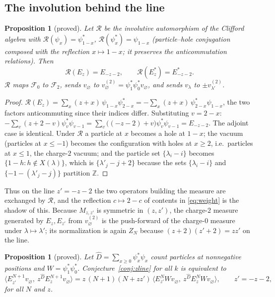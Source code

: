 \documentclass[11pt]{article}
\newtheorem{proposition}[theorem]{Proposition}
\theoremstyle{definition}
\theoremstyle{remark}
\newcommand{\Z}{\mathbb{Z}}
\newcommand{\ket}[1]{v_{#1}}
\begin{document}
\subsection{The involution behind the line}

\begin{proposition}[proved]\label{prop:involution}
Let $\mathcal R$ be the involutive automorphism of the Clifford algebra with $\mathcal R(\psi_x)=\psi^*_{1-x}$, $\mathcal R(\psi^*_x)=\psi_{1-x}$ (particle--hole conjugation composed with the reflection $x\mapsto1-x$; it preserves the anticommutation relations). Then
\[
\mathcal R(E_z)=E_{-z-2},\qquad\mathcal R(E_z^*)=E_{-z-2}^* .
\]
$\mathcal R$ maps $\mathcal F_0$ to $\mathcal F_2$, sends $\ket\varnothing$ to $\ket\varnothing^{(2)}=\psi^*_1\psi^*_0\ket\varnothing$, and sends $\ket\lambda$ to $\pm\ket{\lambda'}^{(2)}$.
\end{proposition}

\begin{proof}
$\mathcal R(E_z)=\sum_x(z+x)\,\psi_{1-x}\psi^*_{2-x}=-\sum_x(z+x)\,\psi^*_{2-x}\psi_{1-x}$, the two factors anticommuting since their indices differ. Substituting $v=2-x$: $-\sum_v(z+2-v)\psi^*_v\psi_{v-1}=\sum_v\bigl((-z-2)+v\bigr)\psi^*_v\psi_{v-1}=E_{-z-2}$. The adjoint case is identical. Under $\mathcal R$ a particle at $x$ becomes a hole at $1-x$; the vacuum (particles at $x\le-1$) becomes the configuration with holes at $x\ge2$, i.e.\ particles at $x\le1$, the charge-$2$ vacuum; and the particle set $\{\lambda_i-i\}$ becomes $\{1-h:h\notin X(\lambda)\}$, which is $\{\lambda'_j-j+2\}$ because the sets $\{\lambda_i-i\}$ and $\{-1-(\lambda'_j-j)\}$ partition $\Z$.
\end{proof}

Thus on the line $z'=-z-2$ the two operators building the measure are exchanged by $\mathcal R$, and the reflection $c\mapsto2-c$ of contents in \eqref{eq:weight} is the shadow of this. Because $M_{z,z'}$ is symmetric in $(z,z')$, the charge-$2$ measure generated by $E_z,E_{z'}$ from $\ket\varnothing^{(2)}$ is the push-forward of the charge-$0$ measure under $\lambda\mapsto\lambda'$; its normalization is again $Z_N$ because $(z+2)(z'+2)=zz'$ on the line.

\begin{proposition}[proved]\label{prop:fockform}
Let $\hat D=\sum_{x\ge0}\psi^*_x\psi_x$ count particles at nonnegative positions and $W=\psi^*_1\psi^*_0$. Conjecture~\ref{conj:zline} for all $k$ is equivalent to
\begin{equation}\label{eq:fockid}
\bigl\langle E_{z'}^{N+1}\ket\varnothing,\ z^{\hat D}E_z^{N+1}\ket\varnothing\bigr\rangle
=z\,(N+1)(N+zz')\,\bigl\langle E_{z'}^{N}W\ket\varnothing,\ z^{\hat D}E_z^{N}W\ket\varnothing\bigr\rangle,\qquad z'=-z-2,
\end{equation}
for all $N$ and $z$.
\end{proposition}
\end{document}
